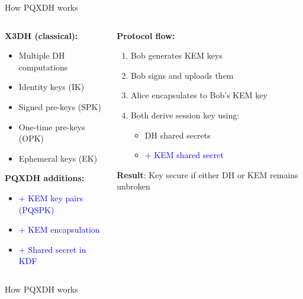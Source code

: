 \documentclass[aspectratio=169, lualatex, handout]{beamer}
\begin{document}
\begin{frame}{How PQXDH works}
	\begin{columns}[c]
		\begin{column}{0.55\textwidth}
			\textbf{X3DH (classical):}
			\begin{itemize}
				\item Multiple DH computations
				\item Identity keys (IK)
				\item Signed pre-keys (SPK)
				\item One-time pre-keys (OPK)
				\item Ephemeral keys (EK)
			\end{itemize}
			\vspace{3mm}
			\textbf{PQXDH additions:}
			\begin{itemize}
				\item \textcolor{blue}{+ KEM key pairs (PQSPK)}
				\item \textcolor{blue}{+ KEM encapsulation}
				\item \textcolor{blue}{+ Shared secret in KDF}
			\end{itemize}
		\end{column}
		\begin{column}{0.45\textwidth}
			\textbf{Protocol flow:}
			\begin{enumerate}
				\item Bob generates KEM keys
				\item Bob signs and uploads them
				\item Alice encapsulates to Bob's KEM key
				\item Both derive session key using:
				      \begin{itemize}
					      \item DH shared secrets
					      \item \textcolor{blue}{+ KEM shared secret}
				      \end{itemize}
			\end{enumerate}
			\vspace{3mm}
			\textbf{Result}: Key secure if either DH or KEM remains unbroken
		\end{column}
	\end{columns}
\end{frame}

\begin{frame}{How PQXDH works}
\end{frame}
\end{document}

